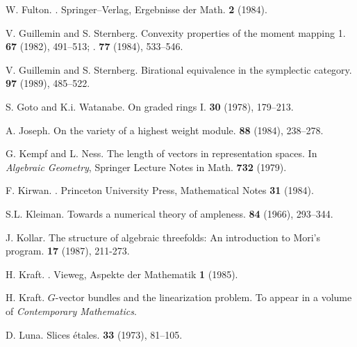 \documentclass{article}
\begin{document}
\begin{thebibliography}{25}
  {W. Fulton.}
  .
  \newblock Springer--Verlag, {Ergebnisse der Math.} \textbf{2} (1984).

  {V. Guillemin and S. Sternberg.}
  \newblock Convexity properties of the moment mapping 1.
   \textbf{67} (1982), 491--513;
  .
   \textbf{77} (1984), 533--546.

  {V. Guillemin and S. Sternberg.}
  \newblock Birational equivalence in the symplectic category.
   \textbf{97} (1989), 485--522.

  {S. Goto and K.i. Watanabe.}
  \newblock On graded rings I.
   \textbf{30} (1978), 179--213.

  {A. Joseph.}
  \newblock On the variety of a highest weight module.
   \textbf{88} (1984), 238--278.

  {G. Kempf and L. Ness.}
  \newblock The length of vectors in representation spaces.
  \newblock In {\em Algebraic Geometry}, Springer Lecture Notes in Math. \textbf{732} (1979).

  {F. Kirwan.}
  .
  \newblock Princeton University Press, Mathematical Notes \textbf{31} (1984).

  {S.L. Kleiman.}
  \newblock Towards a numerical theory of ampleness.
   \textbf{84} (1966), 293--344.

  {J. Kollar.}
  \newblock The structure of algebraic threefolds: An introduction to Mori's program.
   \textbf{17} (1987), 211-273.

  {H. Kraft.}
  .
  \newblock Vieweg, Aspekte der Mathematik \textbf{1} (1985).

  {H. Kraft.}
  \newblock $G$-vector bundles and the linearization problem.
  \newblock To appear in a volume of {\em Contemporary Mathematics}.

  {D. Luna.}
  \newblock Slices \'{e}tales.
   \textbf{33} (1973), 81--105.


\end{thebibliography}
\end{document}
